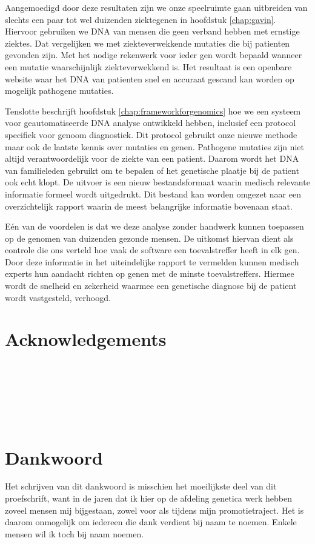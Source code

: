 \begin{appendices}
Aangemoedigd door deze resultaten zijn we onze speelruimte gaan uitbreiden van slechts een paar tot wel duizenden ziektegenen in hoofdstuk \ref{chap:gavin}.
Hiervoor gebruiken we DNA van mensen die geen verband hebben met ernstige ziektes.
Dat vergelijken we met ziekteverwekkende mutaties die bij patienten gevonden zijn.
Met het nodige rekenwerk voor ieder gen wordt bepaald wanneer een mutatie waarschijnlijk ziekteverwekkend is.
Het resultaat is een openbare website waar het DNA van patienten snel en accuraat gescand kan worden op mogelijk pathogene mutaties.

Tenslotte beschrijft hoofdstuk \ref{chap:frameworkforgenomics} hoe we een systeem voor geautomatiseerde DNA analyse ontwikkeld hebben, inclusief een protocol specifiek voor genoom diagnostiek.
Dit protocol gebruikt onze nieuwe methode maar ook de laatste kennis over mutaties en genen.
Pathogene mutaties zijn niet altijd verantwoordelijk voor de ziekte van een patient.
Daarom wordt het DNA van familieleden gebruikt om te bepalen of het genetische plaatje bij de patient ook echt klopt.
De uitvoer is een nieuw bestandsformaat waarin medisch relevante informatie formeel wordt uitgedrukt.
Dit bestand kan worden omgezet naar een overzichtelijk rapport waarin de meest belangrijke informatie bovenaan staat.

Eén van de voordelen is dat we deze analyse zonder handwerk kunnen toepassen op de genomen van duizenden gezonde mensen.
De uitkomst hiervan dient als controle die ons verteld hoe vaak de software een toevalstreffer heeft in elk gen.
Door deze informatie in het uiteindelijke rapport te vermelden kunnen medisch experts hun aandacht richten op genen met de minste toevalstreffers.
Hiermee wordt de snelheid en zekerheid waarmee een genetische diagnose bij de patient wordt vastgesteld, verhoogd.

\chapter{Acknowledgements}

\newpage
~\\~\\~\\~\\~\\

\chapter{Dankwoord}
Het schrijven van dit dankwoord is misschien het moeilijkste deel van dit proefschrift, want in de jaren dat ik hier op de afdeling genetica werk hebben zoveel mensen mij bijgestaan, zowel voor als tijdens mijn promotietraject. Het is daarom onmogelijk om iedereen die dank verdient bij naam te noemen. Enkele mensen wil ik toch bij naam noemen.


\end{appendices}
